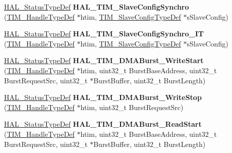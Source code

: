 \begin{DoxyCompactItemize}
\hyperlink{stm32f4xx__hal__def_8h_a63c0679d1cb8b8c684fbb0632743478f}{H\+A\+L\+\_\+\+Status\+Type\+Def} {\bfseries H\+A\+L\+\_\+\+T\+I\+M\+\_\+\+Slave\+Config\+Synchro} (\hyperlink{struct_t_i_m___handle_type_def}{T\+I\+M\+\_\+\+Handle\+Type\+Def} $\ast$htim, \hyperlink{struct_t_i_m___slave_config_type_def}{T\+I\+M\+\_\+\+Slave\+Config\+Type\+Def} $\ast$s\+Slave\+Config)
\item 
\mbox{\label{group___t_i_m___exported___functions___group8_gaceeb45044aea466d267537e7f35d9e3d}} 
\hyperlink{stm32f4xx__hal__def_8h_a63c0679d1cb8b8c684fbb0632743478f}{H\+A\+L\+\_\+\+Status\+Type\+Def} {\bfseries H\+A\+L\+\_\+\+T\+I\+M\+\_\+\+Slave\+Config\+Synchro\+\_\+\+IT} (\hyperlink{struct_t_i_m___handle_type_def}{T\+I\+M\+\_\+\+Handle\+Type\+Def} $\ast$htim, \hyperlink{struct_t_i_m___slave_config_type_def}{T\+I\+M\+\_\+\+Slave\+Config\+Type\+Def} $\ast$s\+Slave\+Config)
\item 
\mbox{\label{group___t_i_m___exported___functions___group8_ga8d1a48bb07dcf9030de10b9c6918087c}} 
\hyperlink{stm32f4xx__hal__def_8h_a63c0679d1cb8b8c684fbb0632743478f}{H\+A\+L\+\_\+\+Status\+Type\+Def} {\bfseries H\+A\+L\+\_\+\+T\+I\+M\+\_\+\+D\+M\+A\+Burst\+\_\+\+Write\+Start} (\hyperlink{struct_t_i_m___handle_type_def}{T\+I\+M\+\_\+\+Handle\+Type\+Def} $\ast$htim, uint32\+\_\+t Burst\+Base\+Address, uint32\+\_\+t Burst\+Request\+Src, uint32\+\_\+t $\ast$Burst\+Buffer, uint32\+\_\+t Burst\+Length)
\item 
\mbox{\label{group___t_i_m___exported___functions___group8_ga8f5649baaf219f2559bbe9e8e2c3658e}} 
\hyperlink{stm32f4xx__hal__def_8h_a63c0679d1cb8b8c684fbb0632743478f}{H\+A\+L\+\_\+\+Status\+Type\+Def} {\bfseries H\+A\+L\+\_\+\+T\+I\+M\+\_\+\+D\+M\+A\+Burst\+\_\+\+Write\+Stop} (\hyperlink{struct_t_i_m___handle_type_def}{T\+I\+M\+\_\+\+Handle\+Type\+Def} $\ast$htim, uint32\+\_\+t Burst\+Request\+Src)
\item 
\mbox{\label{group___t_i_m___exported___functions___group8_ga39c612c473747448615e2e3cb2668224}} 
\hyperlink{stm32f4xx__hal__def_8h_a63c0679d1cb8b8c684fbb0632743478f}{H\+A\+L\+\_\+\+Status\+Type\+Def} {\bfseries H\+A\+L\+\_\+\+T\+I\+M\+\_\+\+D\+M\+A\+Burst\+\_\+\+Read\+Start} (\hyperlink{struct_t_i_m___handle_type_def}{T\+I\+M\+\_\+\+Handle\+Type\+Def} $\ast$htim, uint32\+\_\+t Burst\+Base\+Address, uint32\+\_\+t Burst\+Request\+Src, uint32\+\_\+t $\ast$Burst\+Buffer, uint32\+\_\+t Burst\+Length)

\end{DoxyCompactItemize}
